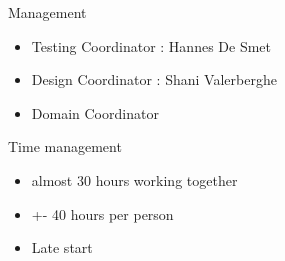 \documentclass[10pt]{beamer}
\begin{document}
\begin{frame}[fragile]{Management}
\begin{itemize}
\item Testing Coordinator : Hannes De Smet
\item Design Coordinator : Shani Valerberghe
\item Domain Coordinator
\end{itemize}
\end{frame}

\begin{frame}[fragile]{Time management}
\begin{itemize}
\item almost 30 hours working together
\item +- 40 hours per person
\item Late start
\end{itemize}
\end{frame}

\end{document}
